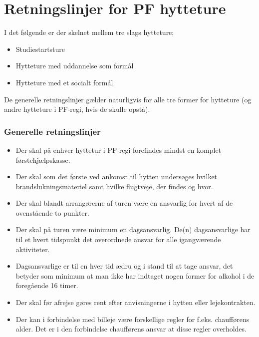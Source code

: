 \section{Retningslinjer for PF hytteture}
I det følgende er der skelnet mellem tre slags hytteture;
\begin{itemize}\addtolength{\itemsep}{-0.5\baselineskip}
\item Studiestartsture
\item Hytteture med uddannelse som formål
\item Hytteture med et socialt formål
\end{itemize}

De generelle retningslinjer gælder naturligvis for alle tre former for hytteture (og andre hytteture i PF-regi, hvis de
skulle opstå).

\subsubsection{Generelle retningslinjer}
\begin{itemize}\addtolength{\itemsep}{-0.5\baselineskip}
\item Der skal på enhver hyttetur i PF-regi forefindes mindst en komplet førstehjælpskasse.
\item Der skal som det første ved ankomst til hytten undersøges hvilket brandslukningsmateriel samt hvilke
flugtveje, der findes og hvor.
\item Der skal blandt arrangørerne af turen være en ansvarlig for hvert af de ovenstående to punkter.
\item Der skal på turen være minimum en dagsansvarlig. De(n) dagsansvarlige har til et hvert tidspunkt det overordnede
ansvar for alle igangværende aktiviteter.
\item Dagsansvarlige er til en hver tid ædru og i stand til at tage ansvar, det betyder som minimum at man ikke har indtaget nogen former for alkohol i de foregående 16 timer.
\item Der skal før afrejse gøres rent efter anvisningerne i hytten eller lejekontrakten.
\item Der kan i forbindelse med billeje være forskellige regler for f.eks. chaufførens alder. Det er i den forbindelse chaufførens ansvar at disse regler overholdes.
\end{itemize}

